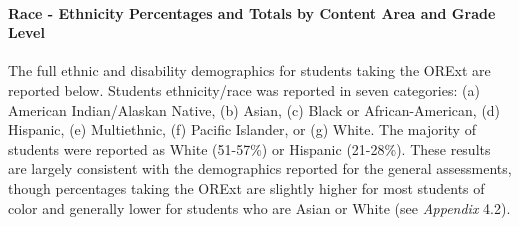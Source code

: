 \documentclass[]{article}
\let\oldparagraph\paragraph
\renewcommand{\paragraph}[1]{\oldparagraph{#1}\mbox{}}
\begin{document}
\hypertarget{race---ethnicity-percentages-and-totals-by-content-area-and-grade-level}{%
\paragraph{Race - Ethnicity Percentages and Totals by Content Area and
Grade
Level}\label{race---ethnicity-percentages-and-totals-by-content-area-and-grade-level}}

The full ethnic and disability demographics for students taking the
ORExt are reported below. Students ethnicity/race was reported in seven
categories: (a) American Indian/Alaskan Native, (b) Asian, (c) Black or
African-American, (d) Hispanic, (e) Multiethnic, (f) Pacific Islander,
or (g) White. The majority of students were reported as White (51-57\%)
or Hispanic (21-28\%). These results are largely consistent with the
demographics reported for the general assessments, though percentages
taking the ORExt are slightly higher for most students of color and
generally lower for students who are Asian or White (see \emph{Appendix}
4.2).
\end{document}
